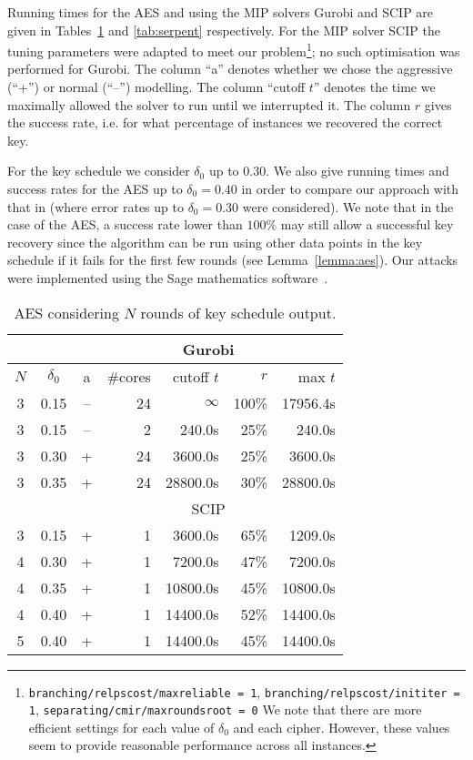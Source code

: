 Running times for the AES and \Serpent using the MIP solvers Gurobi \cite{gurobi} and SCIP \cite{scip} are given in Tables~\ref{tab:aes} and \ref{tab:serpent} respectively.
For the MIP solver SCIP the tuning parameters were adapted to meet our problem\footnote{\texttt{branching/relpscost/maxreliable = 1}, \texttt{branching/relpscost/inititer = 1}, \texttt{separating/cmir/maxroundsroot = 0} We note that there are more efficient settings for each value of $\delta_0$ and each cipher. However, these values seem to provide reasonable performance across all instances.}; no such optimisation was performed for Gurobi. 
The column ``a'' denotes whether we chose the aggressive (``+'') or normal (``--'') modelling. The column ``cutoff $t$'' denotes the time we maximally allowed the solver to run until we interrupted it. The column $r$ gives the success rate, i.e. for what percentage of instances we recovered the correct key.

For the \Serpent key schedule we consider $\delta_0$ up to $0.30$. We also give running times and success rates for the AES up to $\delta_0 = 0.40$ in order to compare our approach with that in \cite{coldboot08} (where error rates up to $\delta_0 = 0.30$ were considered). We note that in the case of the AES, a success rate lower than $100\%$ may still allow a successful key recovery since the algorithm can be run using other data points in the key schedule if it fails for the first few rounds (see Lemma~\ref{lemma:aes}). Our attacks were implemented using the Sage mathematics software~\cite{sage}.

\begin{table}[htbp]
\begin{center}
\begin{tabular}{|c|c| c|r|r|r|r|}
\hline
 & & \multicolumn{5}{c|}{Gurobi}\\
\hline
$N$ & $\delta_0$  & a & \#cores & cutoff $t$ & $r$ & max $t$ \\
\hline
3 & 0.15 &-- & 24 & $\infty$ & 100\% & 17956.4s \\
3 & 0.15 &-- &  2 &   240.0s &  25\% &   240.0s \\
\hline
3 & 0.30 & + & 24 &  3600.0s &  25\% &  3600.0s \\
\hline
3 & 0.35 & + & 24 & 28800.0s &  30\% & 28800.0s \\
\hline
 & & \multicolumn{5}{c|}{SCIP}\\ %
\hline
3 & 0.15 & + & 1 &  3600.0s &  65\% & 1209.0s\\ %
\hline
4 & 0.30 & + & 1 &  7200.0s &  47\% &  7200.0s\\ %
\hline
4 & 0.35 & + & 1 & 10800.0s &  45\% & 10800.0s\\ %
\hline
4 & 0.40 & + & 1 & 14400.0s &  52\% & 14400.0s\\ %
5 & 0.40 & + & 1 & 14400.0s &  45\% & 14400.0s\\ %
\hline
\end{tabular}
\end{center}
\caption{AES considering $N$ rounds of key schedule output.}
\label{tab:aes}
\end{table}


